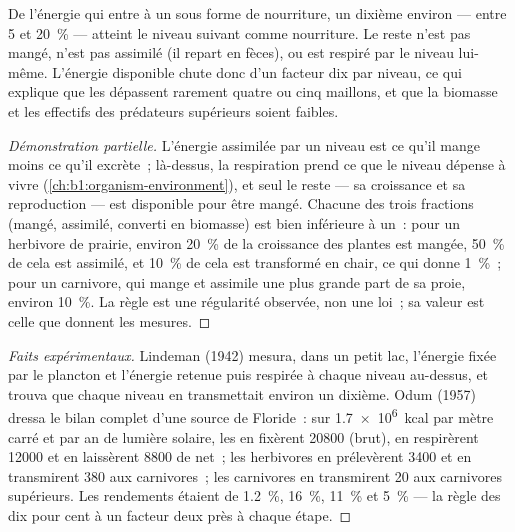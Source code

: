 \begin{theorem}\label{thm:b1:ecosystem-organization:lindeman}
De l'énergie qui entre à un  sous forme de nourriture,
un dixième environ --- entre \qty{5}{} et \qty{20}{\%} --- atteint le
niveau suivant comme nourriture. Le reste n'est pas mangé, n'est pas
assimilé (il repart en fèces), ou est respiré par le niveau lui-même.
L'énergie disponible chute donc d'un facteur dix par niveau, ce qui
explique que les  dépassent rarement quatre ou cinq
maillons, et que la biomasse et les effectifs des prédateurs supérieurs
soient faibles.
\end{theorem}
\begin{proof}[Démonstration partielle]
L'énergie assimilée par un niveau est ce qu'il mange moins ce qu'il
excrète~; là-dessus, la respiration prend ce que le niveau dépense à
vivre (\cref{ch:b1:organism-environment}), et seul le reste --- sa
croissance et sa reproduction --- est disponible pour être mangé.
Chacune des trois fractions (mangé, assimilé, converti en biomasse) est
bien inférieure à un~: pour un herbivore de prairie, environ
\qty{20}{\%} de la croissance des plantes est mangée, \qty{50}{\%} de
cela est assimilé, et \qty{10}{\%} de cela est transformé en chair, ce
qui donne \qty{1}{\%}~; pour un carnivore, qui mange et assimile une
plus grande part de sa proie, environ \qty{10}{\%}. La règle est une
régularité observée, non une loi~; sa valeur est celle que donnent les
mesures.
\end{proof}
\begin{proof}[Faits expérimentaux]
Lindeman (1942) mesura, dans un petit lac, l'énergie fixée par le
plancton et l'énergie retenue puis respirée à chaque niveau au-dessus,
et trouva que chaque niveau en transmettait environ un dixième. Odum
(1957) dressa le bilan complet d'une source de Floride~: sur
\qty{1.7e6}{kcal} par mètre carré et par an de lumière solaire, les
 en fixèrent \num{20800} (brut), en respirèrent \num{12000}
et en laissèrent \num{8800} de net~; les herbivores en prélevèrent
\num{3400} et en transmirent \num{380} aux carnivores~; les carnivores
en transmirent \num{20} aux carnivores supérieurs. Les rendements
étaient de \qty{1.2}{\%}, \qty{16}{\%}, \qty{11}{\%} et \qty{5}{\%} ---
la règle des dix pour cent à un facteur deux près à chaque étape.
\end{proof}

